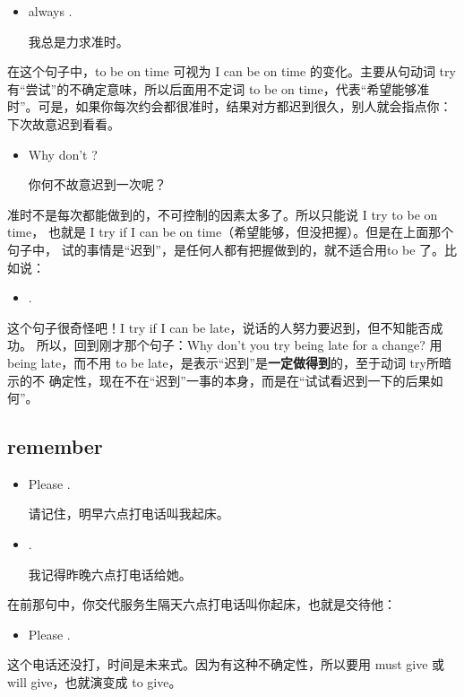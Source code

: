 \begin{itemize}
\item  {} always  .

  我总是力求准时。
\end{itemize}

在这个句子中，to be on time 可视为 I can be on time 的变化。主要从句动词
try 有“尝试”的不确定意味，所以后面用不定词 to be on
time，代表“希望能够准时”。可是，如果你每次约会都很准时，结果对方都迟到很久，别人就会指点你：下次故意迟到看看。

\begin{itemize}
\item  Why don't   ?

  你何不故意迟到一次呢？
\end{itemize}

准时不是每次都能做到的，不可控制的因素太多了。所以只能说 I try to be on time，
也就是 I try if I can be on time（希望能够，但没把握）。但是在上面那个句子中，
试的事情是“迟到”，是任何人都有把握做到的，就不适合用to be 了。比如说：

\begin{itemize}
\item {}  .
\end{itemize}

这个句子很奇怪吧！I try if I can be late，说话的人努力要迟到，但不知能否成功。
所以，回到刚才那个句子：Why don't you try being late for a change? 用 being
late，而不用 to be late，是表示“迟到”是\textbf{一定做得到}的，至于动词 try所暗示的不
确定性，现在不在“迟到”一事的本身，而是在“试试看迟到一下的后果如何”。

\subsection{remember}

\begin{itemize}
\item Please  .

  请记住，明早六点打电话叫我起床。
\item {}  .

  我记得昨晚六点打电话给她。
\end{itemize}

在前那句中，你交代服务生隔天六点打电话叫你起床，也就是交待他：
\begin{itemize}
\item  Please  .
\end{itemize}
这个电话还没打，时间是未来式。因为有这种不确定性，所以要用 must give 或
will give，也就演变成 to give。

